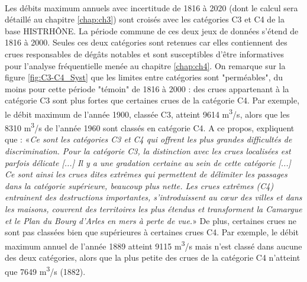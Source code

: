 	\paragraph{} Les débits maximum annuels avec incertitude de 1816 à 2020 (dont le calcul sera détaillé au chapitre \ref{chap:ch3}) sont croisés avec les catégories C3 et C4 de la base HISTRHÔNE. La période commune de ces deux jeux de données s'étend de 1816 à 2000. Seules ces deux catégories sont retenues car elles contiennent des crues responsables de dégâts notables et sont susceptibles d'être informatives pour l'analyse fréquentielle menée au chapitre \ref{chap:ch4}. On remarque sur la figure \ref{fig:C3-C4_Syst} que les limites entre catégories sont "perméables", du moins pour cette période "témoin" de 1816 à 2000 : des crues appartenant à la catégorie C3 sont plus fortes que certaines crues de la catégorie C4. Par exemple, le débit maximum de l'année 1900, classée C3, atteint 9614 m\textsuperscript{3}/s, alors que les 8310 m\textsuperscript{3}/s de l'année 1960 sont classés en catégorie C4. A ce propos, \citet{pichard_sept_2014} expliquent que : «\textit{Ce sont les catégories C3 et C4 qui offrent les plus grandes difficultés de discrimination. Pour la catégorie C3, la distinction avec les crues localisées est parfois délicate [...] Il y a une gradation certaine au sein de cette catégorie [...] Ce sont ainsi les crues dites extrêmes qui permettent de délimiter les passages dans la catégorie supérieure, beaucoup plus nette. Les crues extrêmes (C4) entrainent des destructions importantes, s'introduissent au cœur des villes et dans les maisons, couvrent des territoires les plus étendus et transforment la Camargue et le Plan du Bourg d'Arles en mers à perte de vue.}» De plus, certaines crues ne sont pas classées bien que supérieures à certaines crues C4. Par exemple, le débit maximum annuel de l'année 1889 atteint 9115 m\textsuperscript{3}/s mais n'est classé dans aucune des deux catégories, alors que la plus petite des crues de la catégorie C4 n'atteint que 7649 m\textsuperscript{3}/s (1882). 
	
